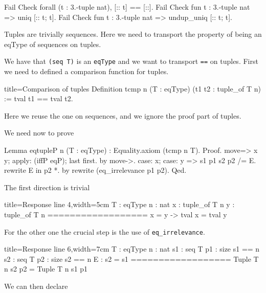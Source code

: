 \begin{coq}{}
Fail Check forall (t : 3.-tuple nat), [:: t] == [::].
Fail Check fun t : 3.-tuple nat => uniq [:: t; t].
Fail Check fun t : 3.-tuple nat => undup_uniq [:: t; t].
\end{coq}

Tuples are trivially sequences.  Here we need to transport the
property of being an eqType of sequences on tuples.


We have that \lstinline/(seq T)/ is an \lstinline/eqType/ and
we want to transport \lstinline/==/ on tuples.  First we need to
defined a comparison function for tuples.

\begin{coq}{title=Comparison of tuples}
Definition tcmp n (T : eqType) (t1 t2 : tuple_of T n) :=
  tval t1 == tval t2.
\end{coq}

Here we reuse the one on sequences, and we ignore the
proof part of tuples.

We need now to prove

\begin{coq}{}
Lemma eqtupleP n (T : eqType) : Equality.axiom (tcmp n T).
Proof.
move=> x y; apply: (iffP eqP); last first.
  by move->.
case: x; case: y => s1 p1 s2 p2 /= E.
rewrite E in p2 *.
by rewrite (eq_irrelevance p1 p2).
Qed.
\end{coq}

The first direction is trivial

\begin{coqout}{title=Response line 4,width=5cm}
T : eqType
n : nat
x : tuple_of T n
y : tuple_of T n
==================
x = y -> tval x = tval y	
\end{coqout}

For the other one the crucial step is the use
of \lstinline/eq_irrelevance/.

\begin{coqout}{title=Response line 6,width=7cm}
T : eqType
n : nat
s1 : seq T
p1 : size s1 == n
s2 : seq T
p2 : size s2 == n
E : s2 = s1
==================
Tuple T n s2 p2 = Tuple T n s1 p1
\end{coqout}

We can then declare

